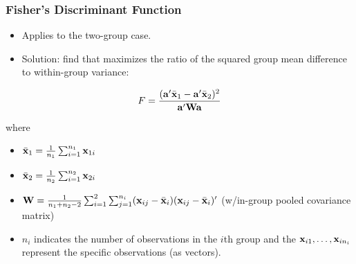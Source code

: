 \documentclass{beamer}
\begin{document}
\begin{frame}
  \frametitle{Fisher's Discriminant Function}

\begin{itemize}
\item Applies to the two-group case.
\item Solution: find  that maximizes the ratio of the squared group mean difference to within-group variance:
\end{itemize}

\[
F = \frac{(\mathbf{a}'\bar{\mathbf{x}}_1 - \mathbf{a}'\bar{\mathbf{x}}_2)^2}{\mathbf{a}'\mathbf{W}\mathbf{a}}
\]

where
\begin{itemize}
\item $\bar{\mathbf{x}}_1 = \frac{1}{n_1}\sum_{i=1}^{n_1} \mathbf{x}_{1i}$
\item $\bar{\mathbf{x}}_2 = \frac{1}{n_2}\sum_{i=1}^{n_2} \mathbf{x}_{2i}$
\item $\mathbf{W} = \frac{1}{n_1 + n_2 - 2}\sum_{i=1}^{2}\sum_{j=1}^{n_i}(\mathbf{x}_{ij} - \bar{\mathbf{x}}_i)(\mathbf{x}_{ij} - \bar{\mathbf{x}}_i)'$ (w/in-group pooled covariance matrix)
\item $n_i$ indicates the number of observations in the $i$th group and the $\mathbf{x}_{i1},\ldots,\mathbf{x}_{in_i}$ represent the specific observations (as vectors).
\end{itemize}

% 
% 
% 
% 

\end{frame}

\end{document}
